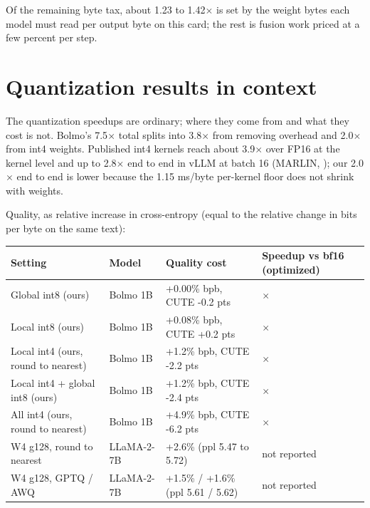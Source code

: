 \documentclass[11pt,a4paper]{article}
\newcommand{\x}{\ensuremath{\times}}
\begin{document}
Of the remaining byte tax, about 1.23 to 1.42\x{} is set by the weight bytes each model must read per output byte on this card; the rest is fusion work priced at a few percent per step.

\section{Quantization results in context}\label{quantization-results-in-context}

The quantization speedups are ordinary; where they come from and what they cost is not. Bolmo's 7.5\x{} total splits into 3.8\x{} from removing overhead and 2.0\x{} from int4 weights. Published int4 kernels reach about 3.9\x{} over FP16 at the kernel level and up to 2.8\x{} end to end in vLLM at batch 16 (MARLIN, \citet{frantar2025marlin}); our 2.0\x{} end to end is lower because the 1.15 ms/byte per-kernel floor does not shrink with weights.

Quality, as relative increase in cross-entropy (equal to the relative change in bits per byte on the same text):

\begin{center}\small\setlength{\tabcolsep}{4pt}
\begin{tabular}{@{}>{\raggedright\arraybackslash}p{}>{\raggedright\arraybackslash}p{}>{\raggedright\arraybackslash}p{}>{\raggedright\arraybackslash}p{}@{}}
\toprule
\textbf{Setting} & \textbf{Model} & \textbf{Quality cost} & \textbf{Speedup vs bf16 (optimized)} \\
\midrule
Global int8 (ours) & Bolmo 1B & +0.00\% bpb, CUTE -0.2 pts & 1.26\x{} \\
Local int8 (ours) & Bolmo 1B & +0.08\% bpb, CUTE +0.2 pts & 1.16\x{} \\
Local int4 (ours, round to nearest) & Bolmo 1B & +1.2\% bpb, CUTE -2.2 pts & 1.27\x{} \\
Local int4 + global int8 (ours) & Bolmo 1B & +1.2\% bpb, CUTE -2.4 pts & 1.60\x{} \\
All int4 (ours, round to nearest) & Bolmo 1B & +4.9\% bpb, CUTE -6.2 pts & 2.00\x{} \\
W4 g128, round to nearest & LLaMA-2-7B & +2.6\% (ppl 5.47 to 5.72) & not reported \\
W4 g128, GPTQ / AWQ & LLaMA-2-7B & +1.5\% / +1.6\% (ppl 5.61 / 5.62) & not reported \\
\bottomrule
\end{tabular}
\end{center}
\end{document}

